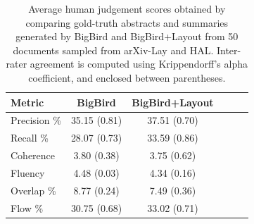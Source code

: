 \begin{table}[ht]
\centering
\small
\begin{tabular}{lccccc}
\toprule
\textbf{Metric}        & \textbf{BigBird} & \textbf{BigBird+Layout} \\ 
\midrule
Precision \%    &    35.15 \scriptsize{(0.81)}            &      37.51 \scriptsize{(0.70)}                   \\
Recall \%       &    28.07 \scriptsize{(0.73)}             &     33.59 \scriptsize{(0.86)}                   \\
Coherence     &     3.80 \scriptsize{(0.38)}             &      3.75 \scriptsize{(0.62)}                   \\ 
Fluency       &     4.48 \scriptsize{(0.03)}             &      4.34 \scriptsize{(0.16)}                   \\
Overlap \%     &    8.77 \scriptsize{(0.24)}             &     7.49 \scriptsize{(0.36)}                    \\ 
Flow \%             &   30.75 \scriptsize{(0.68)}          &    33.02 \scriptsize{(0.71)}                     \\
\bottomrule
\end{tabular}
\caption{Average human judgement scores obtained by comparing gold-truth abstracts and summaries generated by BigBird and BigBird+Layout from 50 documents sampled from arXiv-Lay and HAL. Inter-rater agreement	is computed using Krippendorff's alpha coefficient, and enclosed between parentheses.}
\label{tab:human-eval-scores}
\end{table}

